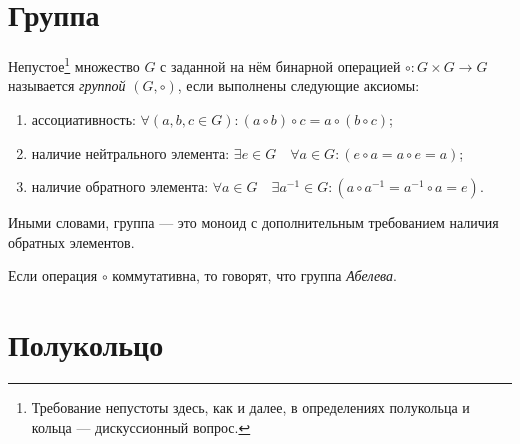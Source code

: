 \section{Группа}

\begin{definition}
Непустое\footnote{Требование непустоты здесь, как и далее, в определениях полукольца и кольца --- дискуссионный вопрос.} множество $G$ с заданной на нём бинарной операцией $\circ: {G} \times {G} \to {G}$ называется \emph{группой} $(G ,\circ)$, если выполнены следующие аксиомы:
\begin{enumerate}
\item ассоциативность: $\forall (a,b,c\in G)\colon (a\circ b)\circ c = a\circ (b \circ c)$;
\item наличие нейтрального элемента: $ \exists e \in G \quad \forall a\in G\colon (e \circ a = a \circ e = a)$;
\item наличие обратного элемента: $ \forall a\in G\quad \exists a^{-1}\in G\colon (a \circ a^{-1}=a^{-1} \circ a = e)$.
\end{enumerate}

Иными словами, группа --- это моноид с дополнительным требованием наличия обратных элементов.
\end{definition}

\begin{definition}
Если операция $\circ$ коммутативна, то говорят, что группа \textit{Абелева}.
\end{definition}


\section{Полукольцо}

